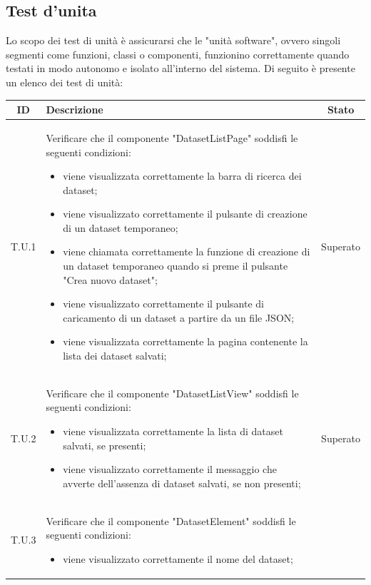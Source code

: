 \newpage
\subsection{Test d'unita}
\label{subsec:test_unita}
Lo scopo dei test di unità è assicurarsi che le "unità software", ovvero singoli segmenti come funzioni, classi o componenti,
funzionino correttamente quando testati in modo autonomo e isolato all'interno del sistema. Di seguito è presente un elenco dei test di unità:
\begin{tabularx}{\textwidth}{|c|X|c|}
    \hline
    \textbf{ID} & \textbf{Descrizione} & \textbf{Stato} \\
    \hline
    \label{tu:tu1}T.U.1 
    & Verificare che il componente "DatasetListPage" soddisfi le seguenti condizioni: %
    \begin{itemize}
        \item viene visualizzata correttamente la barra di ricerca dei dataset;
        \item viene visualizzato correttamente il pulsante di creazione di un dataset temporaneo;
        \item viene chiamata correttamente la funzione di creazione di un dataset temporaneo quando si preme il pulsante "Crea nuovo dataset";
        \item viene visualizzato correttamente il pulsante di caricamento di un dataset a partire da un file JSON;
        \item viene visualizzata correttamente la pagina contenente la lista dei dataset salvati;
    \end{itemize} 
    & Superato \\
    \hline
    \label{tu:tu2}T.U.2 
    & Verificare che il componente "DatasetListView" soddisfi le seguenti condizioni: 
    \begin{itemize}
        \item viene visualizzata correttamente la lista di dataset salvati, se presenti;
        \item viene visualizzato correttamente il messaggio che avverte dell'assenza di dataset salvati, se non presenti;
    \end{itemize} 
    & Superato \\
    \hline
    \label{tu:tu3}T.U.3 
    & Verificare che il componente "DatasetElement" soddisfi le seguenti condizioni: 
    \begin{itemize}
        \item viene visualizzato correttamente il nome del dataset;

\end{itemize}
\end{tabularx}
